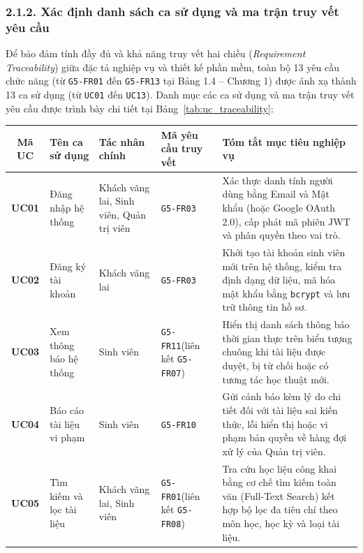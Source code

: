 \subsubsection{2.1.2. Xác định danh sách ca sử dụng và ma trận truy vết yêu cầu}
Để bảo đảm tính đầy đủ và khả năng truy vết hai chiều (\textit{Requirement Traceability}) giữa đặc tả nghiệp vụ và thiết kế phần mềm, toàn bộ 13 yêu cầu chức năng (từ \texttt{G5-FR01} đến \texttt{G5-FR13} tại Bảng 1.4 -- Chương 1) được ánh xạ thành 13 ca sử dụng (từ \texttt{UC01} đến \texttt{UC13}). Danh mục các ca sử dụng và ma trận truy vết yêu cầu được trình bày chi tiết tại Bảng~\ref{tab:uc_traceability}:

\begin{table}[H]
\centering
\footnotesize\linespread{1.05}\selectfont
\setlength{\tabcolsep}{5pt}
\renewcommand{\arraystretch}{1.12}
\begin{tabularx}{\textwidth}{|c|p{3.0cm}|p{2.5cm}|p{2.2cm}|X|}
\hline
\rowcolor[HTML]{EAEAEA}
\textbf{Mã UC} & \textbf{Tên ca sử dụng} & \textbf{Tác nhân chính} & \textbf{Mã yêu cầu truy vết} & \textbf{Tóm tắt mục tiêu nghiệp vụ} \\
\hline
\textbf{UC01} & Đăng nhập hệ thống & Khách vãng lai, Sinh viên, Quản trị viên & \texttt{G5-FR03} & Xác thực danh tính người dùng bằng Email và Mật khẩu (hoặc Google OAuth 2.0), cấp phát mã phiên JWT và phân quyền theo vai trò. \\
\hline
\textbf{UC02} & Đăng ký tài khoản & Khách vãng lai & \texttt{G5-FR03} & Khởi tạo tài khoản sinh viên mới trên hệ thống, kiểm tra định dạng dữ liệu, mã hóa mật khẩu bằng \texttt{bcrypt} và lưu trữ thông tin hồ sơ. \\
\hline
\textbf{UC03} & Xem thông báo hệ thống & Sinh viên & \texttt{G5-FR11}\newline(liên kết \texttt{G5-FR07}) & Hiển thị danh sách thông báo thời gian thực trên biểu tượng chuông khi tài liệu được duyệt, bị từ chối hoặc có tương tác học thuật mới. \\
\hline
\textbf{UC04} & Báo cáo tài liệu vi phạm & Sinh viên & \texttt{G5-FR10} & Gửi cảnh báo kèm lý do chi tiết đối với tài liệu sai kiến thức, lỗi hiển thị hoặc vi phạm bản quyền về hàng đợi xử lý của Quản trị viên. \\
\hline
\textbf{UC05} & Tìm kiếm và lọc tài liệu & Khách vãng lai, Sinh viên & \texttt{G5-FR01}\newline(liên kết \texttt{G5-FR08}) & Tra cứu học liệu công khai bằng cơ chế tìm kiếm toàn văn (Full-Text Search) kết hợp bộ lọc đa tiêu chí theo môn học, học kỳ và loại tài liệu. \\

\end{tabularx}
\end{table}
